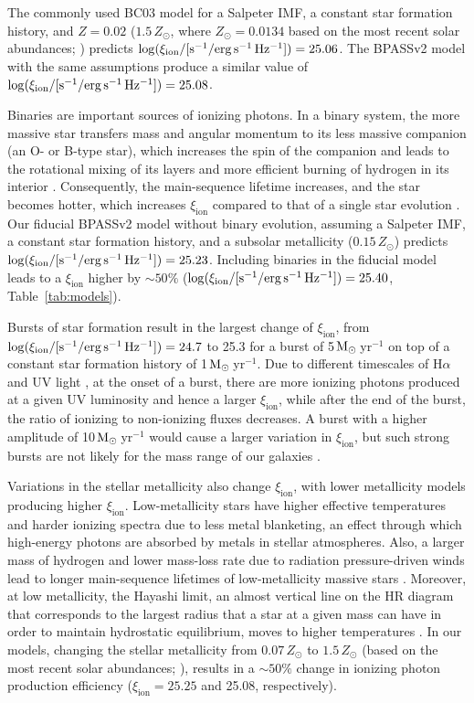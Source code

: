 \documentclass[iop]{emulateapj}
\newcommand{\xiion}{\ensuremath{\xi_{\mathrm{ion}}}}
\newcommand{\halpha}{H\ensuremath{\alpha}}
\def\msun{${\rm M_\odot}$}
\begin{document}
The commonly used BC03 model for a Salpeter IMF, a constant star formation history, and $Z=0.02$ ($1.5\,Z_{\odot}$, where $Z_{\odot}=0.0134$ based on the most recent solar abundances; \citealt{asplund09}) predicts $\log(\xi_{\rm{ion}}/[{\rm{s^{-1}/erg\,s^{-1}\,Hz^{-1}}}])=25.06$. The BPASSv2 model with the same assumptions produce a similar value of $\log(\xi_{\rm{ion}}/[{\rm{s^{-1}/erg\,s^{-1}\,Hz^{-1}}}])=25.08$.

Binaries are important sources of ionizing photons. In a binary system, the more massive star transfers mass and angular momentum to its less massive companion (an O- or B-type star), which increases the spin of the companion and leads to the rotational mixing of its layers and more efficient burning of hydrogen in its interior \citep[e.g.,][]{cantiello07,demink13}. Consequently, the main-sequence lifetime increases, and the star becomes hotter, which increases {\xiion} compared to that of a single star evolution \citep{stanway16}. Our fiducial BPASSv2 model without binary evolution, assuming a Salpeter IMF, a constant star formation history, and a subsolar metallicity ($0.15\,Z_{\odot}$) predicts $\log(\xi_{\rm{ion}}/[{\rm{s^{-1}/erg\,s^{-1}\,Hz^{-1}}}])=25.23$. Including binaries in the fiducial model leads to a {\xiion} higher by $\sim 50\%$ ($\log(\xi_{\rm{ion}}/[{\rm{s^{-1}/erg\,s^{-1}\,Hz^{-1}}}])=25.40$, Table~\ref{tab:models}).

Bursts of star formation result in the largest change of {\xiion}, from $\log(\xi_{\rm{ion}}/[{\rm{s^{-1}/erg\,s^{-1}\,Hz^{-1}}}])=24.7$ to 25.3 for a burst of 5\,\msun\,yr$^{-1}$ on top of a constant star formation history of 1\,\msun\,yr$^{-1}$. Due to different timescales of {\halpha} and UV light \citep{kennicutt12,shivaei15b}, at the onset of a burst, there are more ionizing photons produced at a given UV luminosity and hence a larger {\xiion}, while after the end of the burst, the ratio of ionizing to non-ionizing fluxes decreases.
A burst with a higher amplitude of 10\,\msun\,yr$^{-1}$ would cause a larger variation in {\xiion}, but such strong bursts are not likely for the mass range of our galaxies \citep[e.g.][]{hopkins14,dominguez15}. 

Variations in the stellar metallicity also change {\xiion}, with lower metallicity models producing higher {\xiion}. 
Low-metallicity stars have higher effective temperatures and harder ionizing spectra due to less metal blanketing, an effect through which high-energy photons are absorbed by metals in stellar atmospheres. 
Also, a larger mass of hydrogen and lower mass-loss rate due to radiation pressure-driven winds lead to longer main-sequence lifetimes of low-metallicity massive stars \citep{maeder94,vink01}.
Moreover, at low metallicity, the Hayashi limit, an almost vertical line on the HR diagram that corresponds to the largest radius that a star at a given mass can have in order to maintain hydrostatic equilibrium, moves to higher temperatures \citep{elias85}.
In our models, changing the stellar metallicity from $0.07\,Z_{\odot}$ to $1.5\,Z_{\odot}$ (based on the most recent solar abundances; \citealt{asplund09}), results in a $\sim 50\%$ change in ionizing photon production efficiency ({\xiion}$=25.25$ and 25.08, respectively).
\end{document}
